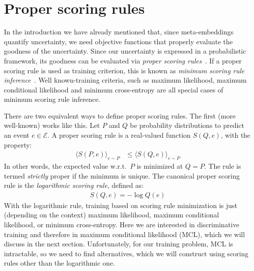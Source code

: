 \documentclass[a4paper,oneside,12pt,english]{report}
\def\expv#1#2{\bigl\langle#1\bigr\rangle_{#2}}
\def\Eset{\mathcal{E}}
\begin{document}
\section{Proper scoring rules}
\def\Dset{\mathcal{D}}
In the introduction we have already mentioned that, since meta-embeddings quantify uncertainty, we need objective functions that properly evaluate the goodness of the uncertainty. Since our uncertainty is expressed in a probabilistic framework, its goodness can be evaluated via \emph{proper scoring rules}~\cite{Gneiting_Raftery_PSR}. If a proper scoring rule is used as training criterion, this is known as \emph{minimum scoring rule inference}~\cite{Dawid_MinScoringRuleInference}. Well known-training criteria, such as maximum likelihood, maximum conditional likelihood and minimum cross-entropy are all special cases of minimum scoring rule inference.

There are two equivalent ways to define proper scoring rules. The first (more well-known) works like this. Let $P$ and $Q$ be probability distributions to predict an event $e\in\Eset$. A proper scoring rule is a real-valued function $S(Q,e)$, with the property:
\begin{align}
\label{eq:psr1}
\expv{S(P,e)}{e\sim P} &\le \expv{S(Q,e)}{e\sim P} 
\end{align}
In other words, the expected value w.r.t.\ $P$ is minimized at $Q=P$. The rule is termed \emph{strictly} proper if the minimum is unique. The canonical proper scoring rule is the \emph{logarithmic scoring rule}, defined as:
\begin{align}
S(Q,e) = -\log Q(e)
\end{align}
With the logarithmic rule, training based on scoring rule minimization is just (depending on the context) maximum likelihood, maximum conditional likelihood, or minimum cross-entropy. Here we are interested in discriminative training and therefore in maximum conditional likelihood (MCL), which we will discuss in the next section. Unfortunately, for our training problem, MCL is intractable, so we need to find alternatives, which we will construct using scoring rules other than the logarithmic one.
\end{document}
